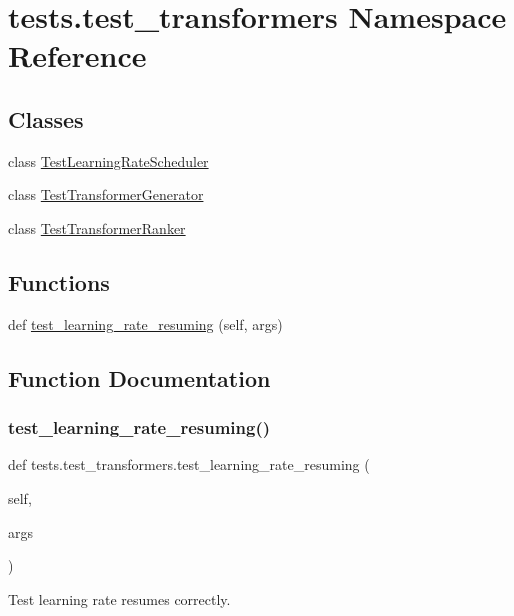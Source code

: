 \hypertarget{namespacetests_1_1test__transformers}{}\section{tests.\+test\+\_\+transformers Namespace Reference}
\label{namespacetests_1_1test__transformers}
\subsection*{Classes}
\begin{DoxyCompactItemize}
\item 
class \hyperlink{classtests_1_1test__transformers_1_1TestLearningRateScheduler}{Test\+Learning\+Rate\+Scheduler}
\item 
class \hyperlink{classtests_1_1test__transformers_1_1TestTransformerGenerator}{Test\+Transformer\+Generator}
\item 
class \hyperlink{classtests_1_1test__transformers_1_1TestTransformerRanker}{Test\+Transformer\+Ranker}
\end{DoxyCompactItemize}
\subsection*{Functions}
\begin{DoxyCompactItemize}
\item 
def \hyperlink{namespacetests_1_1test__transformers_a8d6cf0022229f5deba37f23f30601117}{test\+\_\+learning\+\_\+rate\+\_\+resuming} (self, args)
\end{DoxyCompactItemize}


\subsection{Function Documentation}
\mbox{\label{namespacetests_1_1test__transformers_a8d6cf0022229f5deba37f23f30601117}} 
\subsubsection{\texorpdfstring{test\+\_\+learning\+\_\+rate\+\_\+resuming()}{test\_learning\_rate\_resuming()}}
{\footnotesize\ttfamily def tests.\+test\+\_\+transformers.\+test\+\_\+learning\+\_\+rate\+\_\+resuming (\begin{DoxyParamCaption}\item[{}]{self,  }\item[{}]{args }\end{DoxyParamCaption})}

\begin{DoxyVerb}Test learning rate resumes correctly.
\end{DoxyVerb}
 
